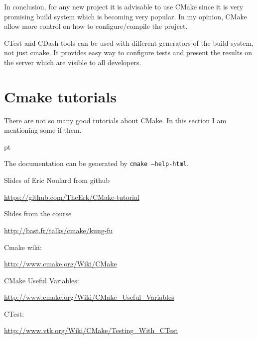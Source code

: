\documentclass[a4paper,10pt]{article}
\begin{document}
In conclusion, for any new project it is advisable to use CMake since it is very promising build system which is becoming very popular. In my opinion, CMake allow more control on how to configure/compile the project. 

CTest and CDash tools can be used with different generators of the build system, not just cmake. It provides easy way to configure tests and present the results on the server which are visible to all developers. 





\section{Cmake tutorials}

There are not so many good tutorials about CMake. In this section I am mentioning some if them.

 pt

\noindent The documentation can be generated by \texttt{cmake --help-html}.

\noindent  Slides of Eric Noulard from github

\url{https://github.com/TheErk/CMake-tutorial}

\noindent Slides from the course 

\url{http://bast.fr/talks/cmake/kung-fu}

\noindent Cmake wiki: 

\url{http://www.cmake.org/Wiki/CMake}

\noindent CMake Useful Variables: 

\url{http://www.cmake.org/Wiki/CMake_Useful_Variables}

\noindent CTest: 

\url{http://www.vtk.org/Wiki/CMake/Testing_With_CTest}
\end{document}
